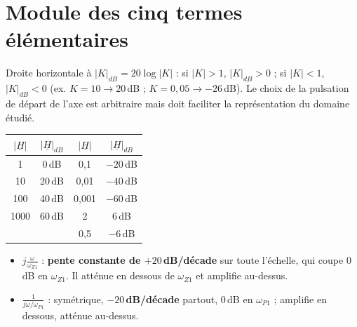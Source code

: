 \section{Module des cinq termes élémentaires}


\begin{propbox}[title={Terme 1 : $\underline H = K$}]
Droite horizontale à $|K|_{dB} = 20\log|K|$ : si $|K| > 1$, $|K|_{dB} > 0$ ; si $|K| < 1$,
$|K|_{dB} < 0$ (ex. $K = 10\to20$\,dB ; $K = 0{,}05\to-26$\,dB). Le choix de la pulsation de
départ de l'axe est arbitraire mais doit faciliter la représentation du domaine étudié.
\end{propbox}


\begin{center}
\begin{tabular}{c|c||c|c}
$|\underline H|$ & $|\underline H|_{dB}$ & $|\underline H|$ & $|\underline H|_{dB}$ \\ \hline
1 & 0\,dB & 0,1 & $-20$\,dB \\
10 & 20\,dB & 0,01 & $-40$\,dB \\
100 & 40\,dB & 0,001 & $-60$\,dB \\
1000 & 60\,dB & 2 & 6\,dB \\
 & & 0,5 & $-6$\,dB \\
\end{tabular}
\end{center}


\begin{propbox}[title={Termes 2 et 3 : imaginaires purs $j\frac\omega{\omega_{Z1}}$ et $\frac1{j\omega/\omega_{P1}}$}]
\begin{itemize}
  \item $j\frac\omega{\omega_{Z1}}$ : \textbf{pente constante de $+20$\,dB/décade} sur toute
        l'échelle, qui coupe 0\,dB en $\omega_{Z1}$. Il atténue en dessous de $\omega_{Z1}$
        et amplifie au-dessus.
  \item $\frac1{j\omega/\omega_{P1}}$ : symétrique, \textbf{$-20$\,dB/décade} partout, 0\,dB
        en $\omega_{P1}$ ; amplifie en dessous, atténue au-dessus.
\end{itemize}
\end{propbox}

